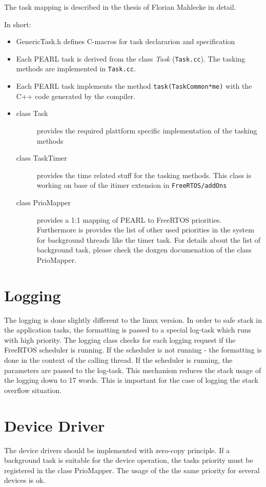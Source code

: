 \begin{enumerate}
The task mapping is described in the thesis of
 Florian Mahlecke in detail.

In short:
\begin{itemize}
\item GenericTask.h defines C-macros for task declararion and specification
\item Each PEARL task is derived from the class {\em Task} (\verb|Task.cc|).
      The tasking methods are implemented in \verb|Task.cc|.
\item Each PEARL task implements the method \verb|task(TaskCommon*me)| 
    with the C++ code generated by the compiler.
\item {
  \begin{description}
  \item[class Task] provides the required plattform specific implementation
     of the tasking methods
  \item[class TaskTimer] provides the time related stuff for the tasking
     methods. This class is working on base of the itimer extension 
     in \texttt{FreeRTOS/addOns}
  \item[class PrioMapper] provides a 1:1 mapping of PEARL to FreeRTOS
      priorities. Furthermore is provides the list of other used
      priorities in the system for background threads like the timer task.
      For details about the list of background task, please 
      check the doxgen documenation of the class PrioMapper.
  \end{description}
}
\end{itemize}

\section{Logging}
The logging is done slightly different to the linux version.
In order to safe stack in the application tasks, the formatting is passed
to a special log-task which runs with high priority.
The logging class checks for each logging request if the FreeRTOS scheduler
is running. If the scheduler is not running - the formatting is done in the 
context of the calling thread. If the scheduler is running, the parameters
are passed to the log-task.
This mechanism reduces the stack usage of the logging down to 17 words. This
is important for the case of logging the stack overflow situation.

\section{Device Driver}
The device drivers should be implemented with zero-copy principle.
If a background task is suitable for the device operation, the 
tasks priority must be registered in the class PrioMapper. The usage
of the the same priority for several devices is ok.


\end{enumerate}

